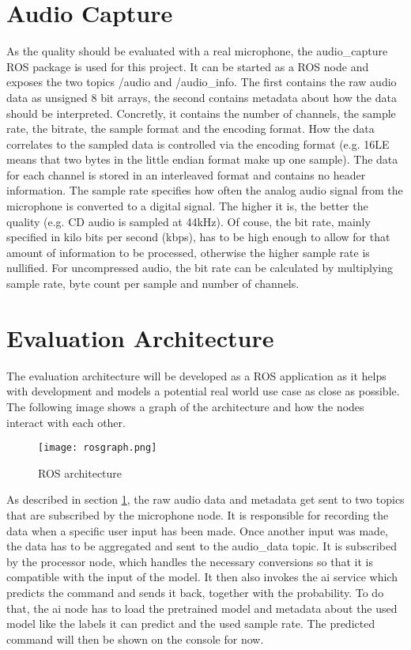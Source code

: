 \section{Audio Capture} \label{audio_capture}
As the quality should be evaluated with a real microphone, the audio\_capture ROS package is used for this project. It can be started as a ROS node
and exposes the two topics /audio and /audio\_info. The first contains the raw audio data as unsigned 8 bit arrays, the second contains metadata about
how the data should be interpreted. Concretly, it contains the number of channels, the sample rate, the bitrate, the sample format and the encoding format.
How the data correlates to the sampled data is controlled via the encoding format (e.g. 16LE means that two bytes in the little endian format make up one sample).
The data for each channel is stored in an interleaved format and contains no header information. The sample rate specifies how often the analog audio signal from
the microphone is converted to a digital signal. The higher it is, the better the quality (e.g. CD audio is sampled at 44kHz). Of couse, the bit rate, 
mainly specified in kilo bits per second (kbps), has to be high enough to allow for that amount of information to be processed, otherwise the higher sample rate is nullified. 
For uncompressed audio, the bit rate can be calculated by multiplying sample rate, byte count per sample and number of channels.

\section{Evaluation Architecture}
The evaluation architecture will be developed as a ROS application as it helps with development and models a potential real world use case as close as possible. 
The following image shows a graph of the architecture and how the nodes interact with each other.

\begin{figure}
  \texttt{[image: rosgraph.png]}
  \caption{ROS architecture}
  \label{fig:rosgraph}
\end{figure}

As described in section \ref{audio_capture}, the raw audio data and metadata get sent to two topics that are subscribed by the microphone node. It is responsible 
for recording the data when a specific user input has been made. Once another input was made, the data has to be aggregated and sent to the audio\_data topic. It is 
subscribed by the processor node, which handles the necessary conversions so that it is compatible with the input of the model. It then also invokes the ai service
which predicts the command and sends it back, together with the probability. To do that, the ai node has to load the pretrained model and metadata about the
used model like the labels it can predict and the used sample rate. The predicted command will then be shown on the console for now.
